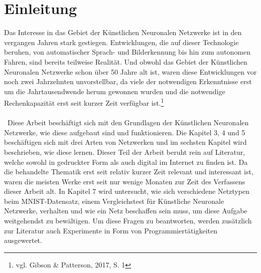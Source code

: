 \documentclass[a4paper,12pt,ngerman,oneside]{scrreprt}	%
\newcommand{\practitioner}[1]{vgl. Gibson \& Patterson, 2017, S. {#1}}
\begin{document}
	\begingroup
		\renewcommand*{\chapterpagestyle}{empty}
		\pagestyle{empty}
		\tableofcontents
		\clearpage
	\endgroup

	
	\chapter{Einleitung}\label{Einleitung}
	
	
	Das Interesse in das Gebiet der Künstlichen Neuronalen Netzwerke ist in den vergangen Jahren stark gestiegen. Entwicklungen, die auf dieser Technologie beruhen, von automatischer Sprach- und Bilderkennung bis hin zum autonomen Fahren, sind bereits teilweise Realität. Und obwohl das Gebiet der Künstlichen Neuronalen Netzwerke schon über 50 Jahre alt ist, waren diese Entwicklungen vor noch zwei Jahrzehnten unvorstellbar, da viele der notwendigen Erkenntnisse erst um die Jahrtausendwende herum gewonnen wurden und die notwendige Rechenkapazität erst seit kurzer Zeit verfügbar ist.\footnote{\practitioner{1}} 
	\\ \
	\\ \
	Diese Arbeit beschäftigt sich mit den Grundlagen der Künstlichen Neuronalen Netzwerke, wie diese aufgebaut sind und funktionieren. Die Kapitel 3, 4 und 5 beschäftigen sich mit drei Arten von Netzwerken und im sechsten Kapitel wird beschrieben, wie diese lernen. Dieser Teil der Arbeit beruht rein auf Literatur, welche sowohl in gedruckter Form als auch digital im Internet zu finden ist. Da die behandelte Thematik erst seit relativ kurzer Zeit relevant und interessant ist, waren die meisten Werke erst seit nur wenige Monaten zur Zeit des Verfassens dieser Arbeit alt. In Kapitel 7 wird untersucht, wie sich verschiedene Netztypen beim MNIST-Datensatz, einem Vergleichstest für Künstliche Neuronale Netzwerke, verhalten und wie ein Netz beschaffen sein muss, um diese Aufgabe weitgehendst zu bewältigen. Um diese Fragen zu beantworten, werden zusätzlich zur Literatur auch Experimente in Form von Programmiertätigkeiten ausgewertet. 
	
	
	
	
\end{document}

